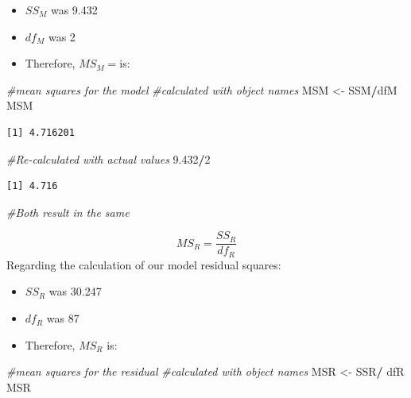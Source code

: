 \documentclass[
  11pt,
]{book}
\newenvironment{Shaded}{\begin{snugshade}}{\end{snugshade}}
\newcommand{\CommentTok}[1]{\textcolor[rgb]{0.37,0.37,0.37}{\textit{#1}}}
\newcommand{\DecValTok}[1]{\textcolor[rgb]{0.06,0.06,0.06}{#1}}
\newcommand{\FloatTok}[1]{\textcolor[rgb]{0.06,0.06,0.06}{#1}}
\newcommand{\NormalTok}[1]{#1}
\newcommand{\OtherTok}[1]{\textcolor[rgb]{0.37,0.37,0.37}{#1}}
\newcommand{\SpecialCharTok}[1]{\textcolor[rgb]{0.43,0.43,0.43}{\textbf{#1}}}
\providecommand{\tightlist}{%
  \setlength{\itemsep}{0pt}\setlength{\parskip}{0pt}}
\begin{document}
\begin{itemize}
\tightlist
\item
  \(SS_M\) was 9.432
\item
  \(df_M\) was 2
\item
  Therefore, \(MS_M=\)is:
\end{itemize}

\begin{Shaded}
\begin{Highlighting}[]
\CommentTok{\#mean squares for the model}
\CommentTok{\#calculated with object names}
\NormalTok{MSM }\OtherTok{\textless{}{-}}\NormalTok{ SSM}\SpecialCharTok{/}\NormalTok{dfM}
\NormalTok{MSM}
\end{Highlighting}
\end{Shaded}

\begin{verbatim}
[1] 4.716201
\end{verbatim}

\begin{Shaded}
\begin{Highlighting}[]
\CommentTok{\#Re{-}calculated with actual values }
\FloatTok{9.432}\SpecialCharTok{/}\DecValTok{2}
\end{Highlighting}
\end{Shaded}

\begin{verbatim}
[1] 4.716
\end{verbatim}

\begin{Shaded}
\begin{Highlighting}[]
\CommentTok{\#Both result in the same}
\end{Highlighting}
\end{Shaded}

\[MS_R = \frac{SS_{R}}{df{_{R}}}\] Regarding the calculation of our model residual squares:

\begin{itemize}
\tightlist
\item
  \(SS_R\) was 30.247
\item
  \(df_R\) was 87
\item
  Therefore, \(MS_R\) is:
\end{itemize}

\begin{Shaded}
\begin{Highlighting}[]
\CommentTok{\#mean squares for the residual}
\CommentTok{\#calculated with object names }
\NormalTok{MSR }\OtherTok{\textless{}{-}}\NormalTok{ SSR}\SpecialCharTok{/}\NormalTok{ dfR}
\NormalTok{MSR}
\end{Highlighting}
\end{Shaded}
\end{document}
